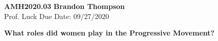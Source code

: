 \noindent
\textbf{AMH2020.03} \hfill \textbf{Brandon Thompson} \\
\normalsize Prof. Luck \hfill Due Date: 09/27/2020 \\

\begin{center}
\textbf{What roles did women play in the Progressive Movement?}
\end{center}